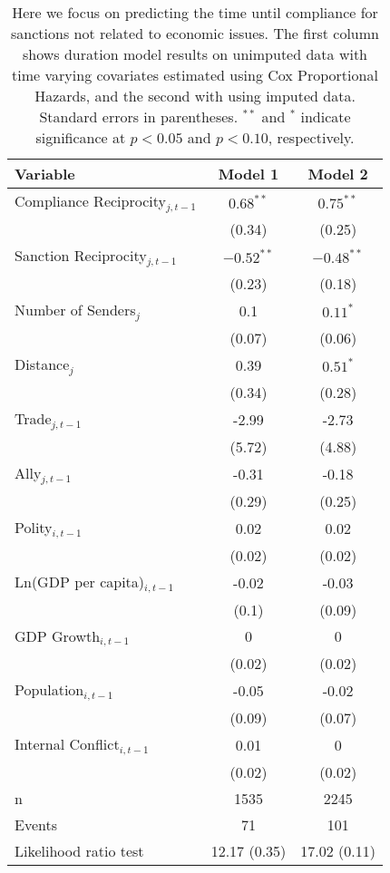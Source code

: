 \begin{table}[ht]
\centering
{\normalsize
\begin{tabular}{lcc}
 Variable & Model 1 & Model 2 \\ 
  \hline
\hline
Compliance Reciprocity$_{j,t-1}$ & $0.68^{\ast\ast}$ & $0.75^{\ast\ast}$ \\ 
   & (0.34) & (0.25) \\ 
  Sanction Reciprocity$_{j,t-1}$ & $-0.52^{\ast\ast}$ & $-0.48^{\ast\ast}$ \\ 
   & (0.23) & (0.18) \\ 
   \hline
Number of Senders$_{j}$ & 0.1 & $0.11^{\ast}$ \\ 
   & (0.07) & (0.06) \\ 
  Distance$_{j}$ & 0.39 & $0.51^{\ast}$ \\ 
   & (0.34) & (0.28) \\ 
  Trade$_{j,t-1}$ & -2.99 & -2.73 \\ 
   & (5.72) & (4.88) \\ 
  Ally$_{j,t-1}$ & -0.31 & -0.18 \\ 
   & (0.29) & (0.25) \\ 
   \hline
Polity$_{i,t-1}$ & 0.02 & 0.02 \\ 
   & (0.02) & (0.02) \\ 
  Ln(GDP per capita)$_{i,t-1}$ & -0.02 & -0.03 \\ 
   & (0.1) & (0.09) \\ 
  GDP Growth$_{i,t-1}$ & 0 & 0 \\ 
   & (0.02) & (0.02) \\ 
  Population$_{i,t-1}$ & -0.05 & -0.02 \\ 
   & (0.09) & (0.07) \\ 
  Internal Conflict$_{i,t-1}$ & 0.01 & 0 \\ 
   & (0.02) & (0.02) \\ 
   \hline
n & 1535 & 2245 \\ 
  Events & 71 & 101 \\ 
  Likelihood ratio test & 12.17 (0.35) & 17.02 (0.11) \\ 
   \hline
\hline
\end{tabular}
}
\caption{Here we focus on predicting the time until compliance for sanctions not related to economic issues. The first column shows duration model results on unimputed data with time varying covariates estimated using Cox Proportional Hazards, and the second with using imputed data. Standard errors in parentheses. $^{**}$ and $^{*}$ indicate significance at $p< 0.05 $ and $p< 0.10 $, respectively.} 
\label{tab:regResultsNonEconSanctions}
\end{table}
